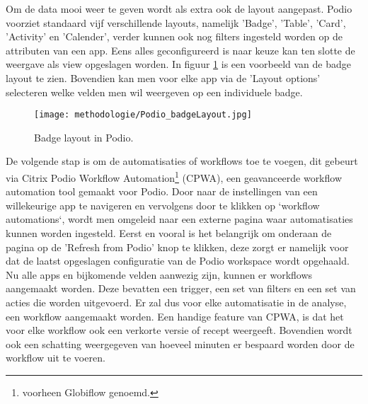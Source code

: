Om de data mooi weer te geven wordt als extra ook de layout aangepast. Podio voorziet standaard vijf verschillende layouts, namelijk 'Badge', 'Table', 'Card', 'Activity' en 'Calender', verder kunnen ook nog filters ingesteld worden op de attributen van een app. Eens alles geconfigureerd is naar keuze kan ten slotte de weergave als view opgeslagen worden. In figuur \ref{fig:meth_podio_badgeLayout} is een voorbeeld van de badge layout te zien. Bovendien kan men voor elke app via de 'Layout options' selecteren welke velden men wil weergeven op een individuele badge. \\

\begin{figure}[h]
    \centering
    \texttt{[image: methodologie/Podio\_badgeLayout.jpg]}
    \caption{Badge layout in Podio.}
    \label{fig:meth_podio_badgeLayout}
\end{figure}

De volgende stap is om de automatisaties of workflows toe te voegen, dit gebeurt via Citrix Podio Workflow Automation\footnote{voorheen Globiflow genoemd.} (CPWA), een geavanceerde workflow automation tool gemaakt voor Podio. Door naar de instellingen van een willekeurige app te navigeren en vervolgens door te klikken op `workflow automations`, wordt men omgeleid naar een externe pagina waar automatisaties kunnen worden ingesteld. Eerst en vooral is het belangrijk om onderaan de pagina op de 'Refresh from Podio' knop te klikken, deze zorgt er namelijk voor dat de laatst opgeslagen configuratie van de Podio workspace wordt opgehaald. Nu alle apps en bijkomende velden aanwezig zijn, kunnen er workflows aangemaakt worden. Deze bevatten een trigger, een set van filters en een set van acties die worden uitgevoerd. Er zal dus voor elke automatisatie in de analyse, een workflow aangemaakt worden. Een handige feature van CPWA, is dat het voor elke workflow ook een verkorte versie of recept weergeeft. Bovendien wordt ook een schatting weergegeven van hoeveel minuten er bespaard worden door de workflow uit te voeren. \\

